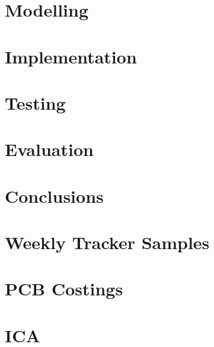 \documentclass[a4paper, 12pt]{report}
\begin{document}
\chapter{Modelling}



\chapter{Implementation}





\chapter{Testing}

\chapter{Evaluation}

\chapter{Conclusions}




\appendix
\chapter{Weekly Tracker Samples}

\chapter{PCB Costings}

\chapter{ICA}

\end{document}
